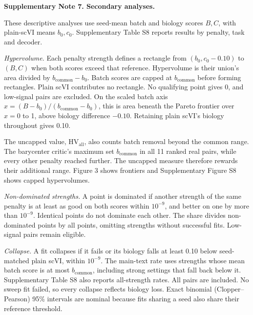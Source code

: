 \medskip\noindent\textbf{Supplementary Note 7. Secondary analyses.}\par\smallskip
\begingroup\small\setlength{\parskip}{3pt}
These descriptive analyses use seed-mean batch and biology scores $B,C$, with plain-scVI means $b_0,c_0$. Supplementary Table S8 reports results by penalty, task and decoder.

\noindent\textit{Hypervolume.} Each penalty strength defines a rectangle from $(b_0,c_0-0.10)$ to $(B,C)$ when both scores exceed that reference. Hypervolume is their union's area divided by $b_{\mathrm{common}}-b_0$. Batch scores are capped at $b_{\mathrm{common}}$ before forming rectangles. Plain scVI contributes no rectangle. No qualifying point gives 0, and low-signal pairs are excluded. On the scaled batch axis $x=(B-b_0)/(b_{\mathrm{common}}-b_0)$, this is area beneath the Pareto frontier over $x=0$ to 1, above biology difference $-0.10$. Retaining plain scVI's biology throughout gives 0.10.

The uncapped value, HV$_{\mathrm{all}}$, also counts batch removal beyond the common range. The barycenter critic's maximum set $b_{\mathrm{common}}$ in all 11 ranked real pairs, while every other penalty reached further. The uncapped measure therefore rewards their additional range. Figure 3 shows frontiers and Supplementary Figure S8 shows capped hypervolumes.

\noindent\textit{Non-dominated strengths.} A point is dominated if another strength of the same penalty is at least as good on both scores within $10^{-9}$, and better on one by more than $10^{-9}$. Identical points do not dominate each other. The share divides non-dominated points by all points, omitting strengths without successful fits. Low-signal pairs remain eligible.

\noindent\textit{Collapse.} A fit collapses if it fails or its biology falls at least 0.10 below seed-matched plain scVI, within $10^{-9}$. The main-text rate uses strengths whose mean batch score is at most $b_{\mathrm{common}}$, including strong settings that fall back below it. Supplementary Table S8 also reports all-strength rates. All pairs are included. No sweep fit failed, so every collapse reflects biology loss. Exact binomial (Clopper--Pearson) 95\% intervals are nominal because fits sharing a seed also share their reference threshold.

